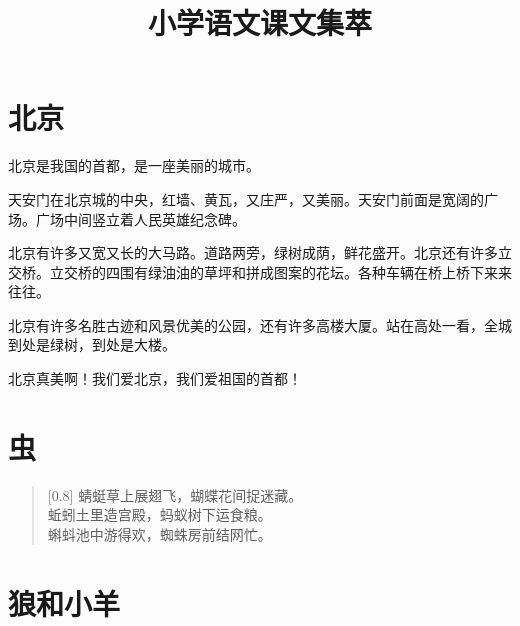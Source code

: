 \documentclass[12pt,UTF-8,openany]{ctexbook}
\title{\zihao{0} \bfseries 小学语文课文集萃}
\author{}
\date{}
\begin{document}
\maketitle
\tableofcontents
\newpage

\chapter{北京}

\begin{Large}
    
    北京是我国的首都，是一座美丽的城市。
    
    天安门在北京城的中央，红墙、黄瓦，又庄严，又美丽。天安门前面是宽阔的广场。广场中间竖立着人民英雄纪念碑。
    
    北京有许多又宽又长的大马路。道路两旁，绿树成荫，鲜花盛开。北京还有许多立交桥。立交桥的四围有绿油油的草坪和拼成图案的花坛。各种车辆在桥上桥下来来往往。
    
    北京有许多名胜古迹和风景优美的公园，还有许多高楼大厦。站在高处一看，全城到处是绿树，到处是大楼。
    
    北京真美啊！我们爱北京，我们爱祖国的首都！
    
\end{Large}

\chapter{虫}

\begin{Large}
    
    \begin{verse}[0.8\linewidth]
        蜻蜓草上展翅飞，蝴蝶花间捉迷藏。 \\
        蚯蚓土里造宫殿，蚂蚁树下运食粮。 \\
        蝌蚪池中游得欢，蜘蛛房前结网忙。
    \end{verse}
    
\end{Large}

\chapter{狼和小羊}
\end{document}
